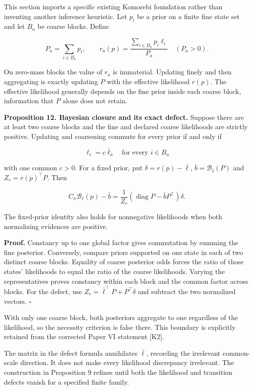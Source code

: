 This section imports a specific existing Komorebi foundation rather than
inventing another inference heuristic. Let \(p_i\) be a prior on a
finite fine state set and let \(B_a\) be coarse blocks. Define

\[
P_a=\sum_{i\in B_a}p_i,\qquad
r_a(p)=\frac{\sum_{i\in B_a}p_i\ell_i}{P_a}
\quad(P_a>0).
\]

On zero-mass blocks the value of \(r_a\) is immaterial. Updating finely
and then aggregating is exactly updating \(P\) with the effective
likelihood \(r(p)\). The effective likelihood generally depends on the
fine prior inside each coarse block, information that \(P\) alone does
not retain.

\textbf{Proposition 12. Bayesian closure and its exact defect.} Suppose
there are at least two coarse blocks and the fine and declared coarse
likelihoods are strictly positive. Updating and coarsening commute for
every prior if and only if

\[
\ell_i=c\bar\ell_a\quad\text{for every }i\in B_a
\]

with one common \(c>0\). For a fixed prior, put
\(\delta=r(p)-\bar\ell\), \(\bar b=\mathcal B_{\bar\ell}(P)\) and
\(Z_r=r(p)^\top P\). Then

\[
\boxed{
C_\pi\mathcal B_{\ell}(p)-\bar b
=
\frac{1}{Z_r}\left(\operatorname{diag}P-\bar bP^\top\right)\delta.
}
\]

The fixed-prior identity also holds for nonnegative likelihoods when
both normalizing evidences are positive.

\textbf{Proof.} Constancy up to one global factor gives commutation by
summing the fine posterior. Conversely, compare priors supported on one
state in each of two distinct coarse blocks. Equality of coarse
posterior odds forces the ratio of those states' likelihoods to equal
the ratio of the coarse likelihoods. Varying the representatives proves
constancy within each block and the common factor across blocks. For the
defect, use \(Z_r=\bar\ell^\top P+P^\top\delta\) and subtract the two
normalized vectors. \(\square\)

With only one coarse block, both posteriors aggregate to one regardless
of the likelihood, so the necessity criterion is false there. This
boundary is explicitly retained from the corrected Paper VI statement
{[}K2{]}.

The matrix in the defect formula annihilates \(\bar\ell\), recording the
irrelevant common-scale direction. It does not make every likelihood
discrepancy irrelevant. The construction in Proposition 9 refines until
both the likelihood and transition defects vanish for a specified finite
family.

